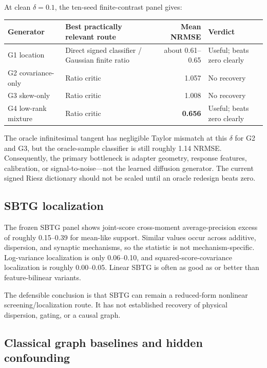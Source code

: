 \documentclass[10pt]{article}
\begin{document}
At clean \(\delta=0.1\), the ten-seed finite-contrast panel gives:

\begin{center}
\begin{tabularx}{0.96\linewidth}{@{}lXrX@{}}
\toprule
Generator & Best practically relevant route & Mean NRMSE & Verdict \\
\midrule
G1 location & Direct signed classifier / Gaussian finite ratio & about 0.61--0.65 & Useful; beats zero clearly \\
G2 covariance-only & Ratio critic & 1.057 & No recovery \\
G3 skew-only & Ratio critic & 1.008 & No recovery \\
G4 low-rank mixture & Ratio critic & \textbf{0.656} & Useful; beats zero clearly \\
\bottomrule
\end{tabularx}
\end{center}

The oracle infinitesimal tangent has negligible Taylor mismatch at this \(\delta\) for G2 and G3, but the oracle-sample classifier is still roughly 1.14 NRMSE. Consequently, the primary bottleneck is adapter geometry, response features, calibration, or signal-to-noise---not the learned diffusion generator. The current signed Riesz dictionary should not be scaled until an oracle redesign beats zero.

\subsection{SBTG localization}

The frozen SBTG panel shows joint-score cross-moment average-precision excess of roughly 0.15--0.39 for mean-like support. Similar values occur across additive, dispersion, and synaptic mechanisms, so the statistic is not mechanism-specific. Log-variance localization is only 0.06--0.10, and squared-score-covariance localization is roughly 0.00--0.05. Linear SBTG is often as good as or better than feature-bilinear variants.

The defensible conclusion is that SBTG can remain a reduced-form nonlinear screening/localization route. It has not established recovery of physical dispersion, gating, or a causal graph.

\subsection{Classical graph baselines and hidden confounding}
\end{document}
